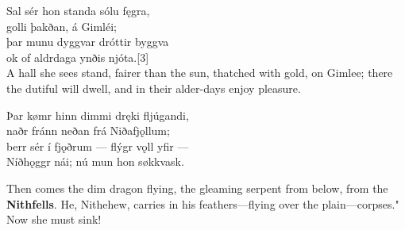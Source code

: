 \bva Sal sér hon standa \hld sólu fęgra, \\%
golli þakðan, \hld á Gimléi; \\%
þar munu dyggvar \hld dróttir byggva \\%
ok of aldrdaga \hld ynðis njóta.[3]\\%

\bvb A hall she sees stand, fairer than the sun, thatched with gold, on Gimlee; there the dutiful  will dwell, and in their alder-days enjoy pleasure.

\bva Þar kømr hinn dimmi \hld dręki fljúgandi, \\%
naðr fránn neðan \hld frá Niðafjǫllum; \\%
berr sér í fjǫðrum \hld — flýgr vǫll yfir — \\%
Níðhǫggr nái; \hld nú mun hon søkkvask.

\bvb Then comes the dim dragon flying, the gleaming serpent from below, from the \textbf{Nithfells}. He, Nithehew, carries in his feathers—flying over the plain—corpses." Now she must sink!
